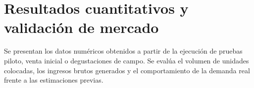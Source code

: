 \section{Resultados cuantitativos y validación de mercado}
\label{sec:resultados_cuantitativos}

Se presentan los datos numéricos obtenidos a partir de la ejecución de pruebas piloto, venta inicial o degustaciones de campo. Se evalúa el volumen de unidades colocadas, los ingresos brutos generados y el comportamiento de la demanda real frente a las estimaciones previas.
